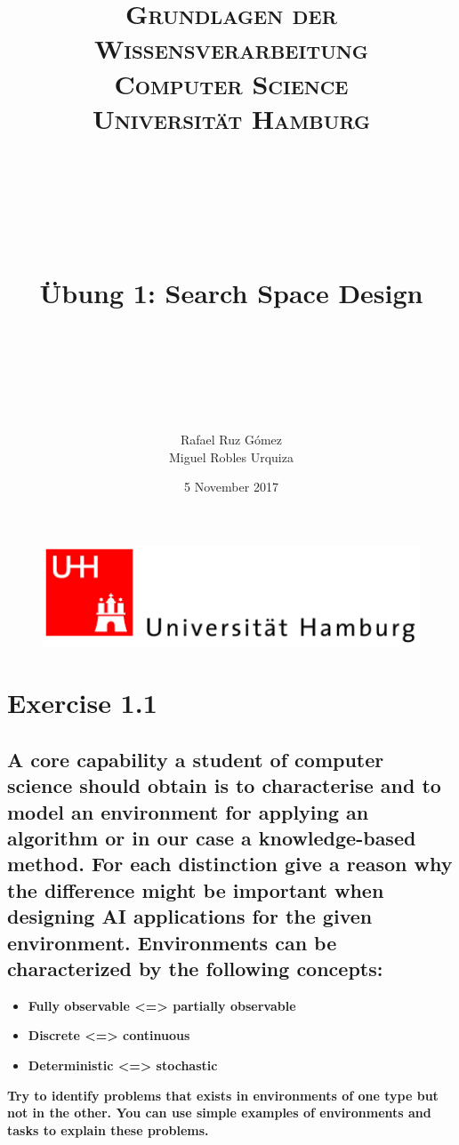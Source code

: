 \documentclass[paper=a4, fontsize=11pt]{scrartcl} %
\title{	
\normalfont \normalsize 
\textsc{\textbf{Grundlagen der Wissensverarbeitung} \\ Computer Science \\ Universität Hamburg} \\ [25pt] %
~\\
~\\
~\\
\horrule{0.5pt} \\[0.4cm] %
\Huge Übung 1: Search Space Design \\ %
\horrule{2pt} \\[0.5cm] %
~\\
~\\
}
\author{Rafael Ruz Gómez\\Miguel Robles Urquiza} %
\date{\normalsize 5 November 2017} %
\numberwithin{equation}{section} %
\numberwithin{figure}{section} %
\numberwithin{table}{section} %
\begin{document}
\maketitle %

\begin{figure}
	\centering
	\includegraphics[scale=0.8]{logo_uni_hamburg.png}
\end{figure}

\newpage %





\section{Exercise 1.1}

\subsection{A core capability a student of computer science should obtain is to characterise 
and to model an environment for applying an algorithm or in our case a knowledge-based method.
For each distinction give a reason why the difference might be important when designing AI applications for the given environment.
Environments can be characterized by the following concepts:}

	\begin{itemize}
		\item \large{ \textbf{Fully observable <=> partially observable}}
	 	\item \large{ \textbf{Discrete <=> continuous}}
	 	\item \large{ \textbf{Deterministic <=> stochastic}}
	\end{itemize}

\large{ \textbf{Try to identify problems that exists in environments of one type but not in the other. You can use simple examples of environments and tasks to explain these problems.}}
\newline
\end{document}
